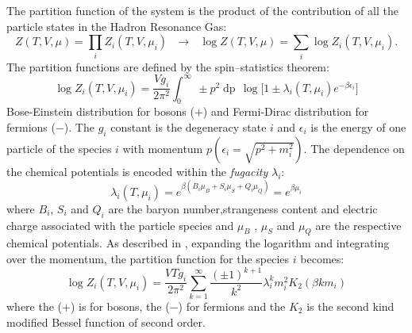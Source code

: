 The partition function of the system is the product of the contribution of all the particle states
in the Hadron Resonance Gas:
\begin{equation} \label{eq:partfuncprod}
    Z(T,V,\mu) = \prod_{i} Z_{i}(T,V,\mu_{i}) \ \ \ \rightarrow \ \ \ 
    \log Z(T,V,\mu) = \sum_{i} \log Z_{i}(T,V,\mu_{i}).
\end{equation}
The partition functions are defined by the spin–statistics theorem:
\begin{equation} \label{eq:partfuncspin}
    \log Z_{i}(T,V,\mu_{i}) = \frac{V g_{i}}{2 \pi^{2}} \int_{0}^{\infty}\
     \pm p^{2} \mathop{dp} \, \log \Big[1\pm \lambda_{i}(T,\mu_{i})e^{- \beta \epsilon_{i}} \Big]
\end{equation}
Bose-Einstein distribution for bosons ($+$) and Fermi-Dirac distribution for fermions ($-$).
The $g_{i}$ constant is the degeneracy state $i$ and $\epsilon_{i}$ is the energy of one 
particle of the species $i$ with momentum $p (\epsilon_{i} = \sqrt{p^{2} + m_{i}^{2}})$.
The dependence on the chemical potentials is encoded within the \textit{fugacity}
$\lambda_{i}$:
\begin{equation} \label{eq:fugacity}
    \lambda_{i}(T,\mu_{i}) = e^{\beta(B_{i}\mu_{B} + S_{i}\mu_{S} + Q_{i}\mu_{Q})}
    = e^{\beta \mu_{i}}
\end{equation}
where $B_{i}$, $S_{i}$ and $Q_{i}$ are the baryon number,strangeness content and electric
charge associated with the particle species and $\mu_{B}$ , $\mu_{S}$ and $\mu_{Q}$ are the 
respective chemical potentials. As described in \cite{pbmstat}, expanding the logarithm and
integrating over the momentum, the partition function for the species $i$ becomes:
\begin{equation}
    \log Z_{i}(T,V,\mu_{i}) = \frac{V T g_{i}}{2 \pi^{2}}
    \sum_{k=1}^{\infty} \frac{(\pm 1)^{k+1}}{k^{2}} \lambda^{k}_{i} m_{i}^{2} K_{2}(\beta k m_{i})
\end{equation}
where the ($+$) is for bosons, the ($-$) for fermions and the $K_{2}$ is the second 
kind modified Bessel function of second order.

